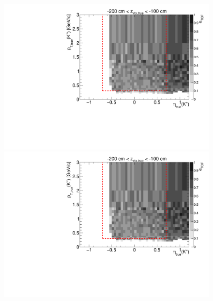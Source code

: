 \begin{figure}[hb]
{  \includegraphics[width=\linewidth,page=16]{graphics/eff/Eff2D_TOF_kaon_Plus.pdf}\\
  \includegraphics[width=\linewidth,page=18]{graphics/eff/Eff2D_TOF_kaon_Plus.pdf}
}%
\end{figure}













